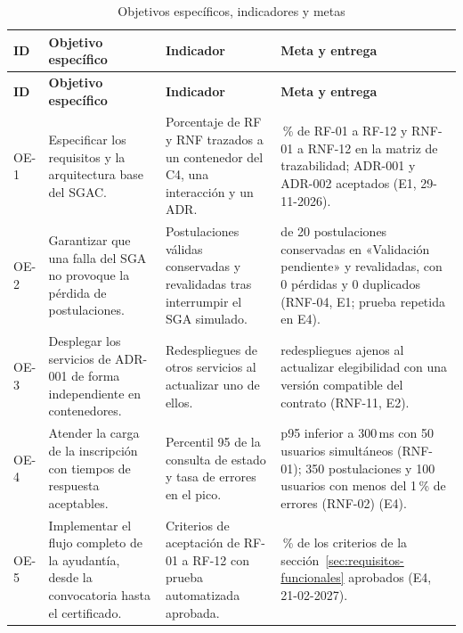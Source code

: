 \begingroup\small
\begin{longtable}{@{}>{\raggedright\arraybackslash}p{}>{\raggedright\arraybackslash}p{}>{\raggedright\arraybackslash}p{}>{\raggedright\arraybackslash}p{}@{}}
\caption{Objetivos específicos, indicadores y metas}\label{tab:objetivos}\\
\toprule
\textbf{ID} & \textbf{Objetivo específico} & \textbf{Indicador} & \textbf{Meta y entrega}\\
\midrule\endfirsthead
\toprule\textbf{ID} & \textbf{Objetivo específico} & \textbf{Indicador} & \textbf{Meta y entrega}\\\midrule\endhead
\bottomrule\endfoot
OE-1 & Especificar los requisitos y la arquitectura base del SGAC. & Porcentaje de RF y RNF trazados a un contenedor del C4, una interacción y un ADR. & 100\,\% de RF-01 a RF-12 y RNF-01 a RNF-12 en la matriz de trazabilidad; ADR-001 y ADR-002 aceptados (E1, 29-11-2026). \\
\addlinespace
OE-2 & Garantizar que una falla del SGA no provoque la pérdida de postulaciones. & Postulaciones válidas conservadas y revalidadas tras interrumpir el SGA simulado. & 20 de 20 postulaciones conservadas en «Validación pendiente» y revalidadas, con 0 pérdidas y 0 duplicados (RNF-04, E1; prueba repetida en E4). \\
\addlinespace
OE-3 & Desplegar los servicios de ADR-001 de forma independiente en contenedores. & Redespliegues de otros servicios al actualizar uno de ellos. & 0 redespliegues ajenos al actualizar elegibilidad con una versión compatible del contrato (RNF-11, E2). \\
\addlinespace
OE-4 & Atender la carga de la inscripción con tiempos de respuesta aceptables. & Percentil 95 de la consulta de estado y tasa de errores en el pico. & p95 inferior a 300\,ms con 50 usuarios simultáneos (RNF-01); 350 postulaciones y 100 usuarios con menos del 1\,\% de errores (RNF-02) (E4). \\
\addlinespace
OE-5 & Implementar el flujo completo de la ayudantía, desde la convocatoria hasta el certificado. & Criterios de aceptación de RF-01 a RF-12 con prueba automatizada aprobada. & 100\,\% de los criterios de la sección~\ref{sec:requisitos-funcionales} aprobados (E4, 21-02-2027). \\
\end{longtable}
\endgroup
